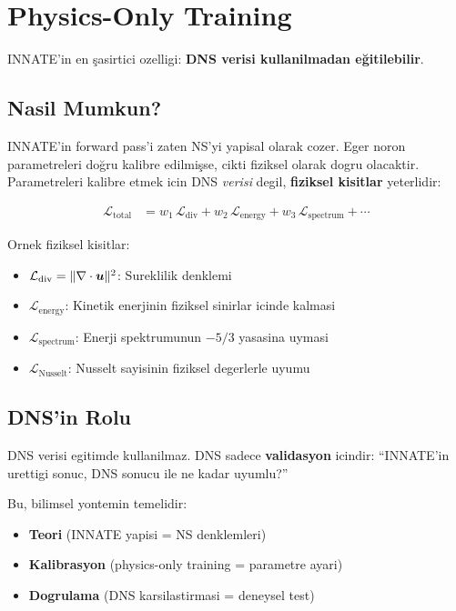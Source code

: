 \section{Physics-Only Training}
\label{sec:physics_only}

INNATE'in en şasirtici ozelligi: \textbf{DNS verisi kullanilmadan eğitilebilir}.

\subsection{Nasil Mumkun?}

INNATE'in forward pass'i zaten NS'yi yapisal olarak cozer. Eger noron parametreleri doğru kalibre edilmişse, cikti fiziksel olarak dogru olacaktir. Parametreleri kalibre etmek icin DNS \emph{verisi} degil, \textbf{fiziksel kisitlar} yeterlidir:

\begin{align}
\mathcal{L}_{\text{total}} &= w_1\,\mathcal{L}_{\text{div}} + w_2\,\mathcal{L}_{\text{energy}} + w_3\,\mathcal{L}_{\text{spectrum}} + \cdots \label{eq:physics_loss}
\end{align}

Ornek fiziksel kisitlar:
\begin{itemize}
\item $\mathcal{L}_{\text{div}} = \|\nabla \cdot\bm{u}\|^2$: Sureklilik denklemi
\item $\mathcal{L}_{\text{energy}}$: Kinetik enerjinin fiziksel sinirlar icinde kalmasi
\item $\mathcal{L}_{\text{spectrum}}$: Enerji spektrumunun $-5/3$ yasasina uymasi
\item $\mathcal{L}_{\text{Nusselt}}$: Nusselt sayisinin fiziksel degerlerle uyumu
\end{itemize}

\subsection{DNS'in Rolu}

DNS verisi egitimde kullanilmaz. DNS sadece \textbf{validasyon} icindir: ``INNATE'in urettigi sonuc, DNS sonucu ile ne kadar uyumlu?''

Bu, bilimsel yontemin temelidir:
\begin{itemize}
\item \textbf{Teori} (INNATE yapisi = NS denklemleri)
\item \textbf{Kalibrasyon} (physics-only training = parametre ayari)
\item \textbf{Dogrulama} (DNS karsilastirmasi = deneysel test)
\end{itemize}


